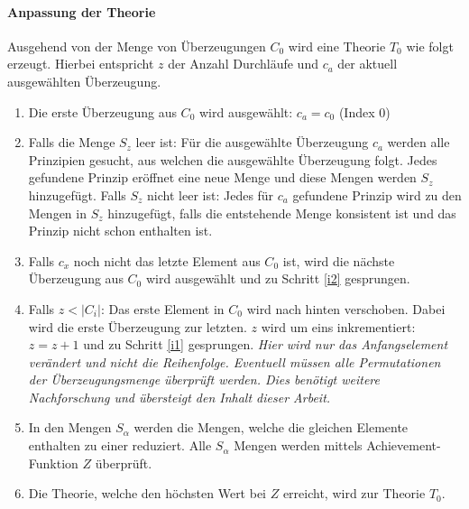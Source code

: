 \documentclass{article}
\begin{document}
\paragraph{Anpassung der Theorie}
Ausgehend von der Menge von Überzeugungen $C_0$ wird eine Theorie $T_0$ wie folgt erzeugt. Hierbei entspricht $z$ der Anzahl Durchläufe und $c_a$ der aktuell ausgewählten Überzeugung. 
\begin{enumerate}
    \item \label{i1} Die erste Überzeugung aus $C_0$ wird ausgewählt: $c_a = c_0$ (Index 0)
    \item \label{i2} Falls die Menge $S_z$ leer ist: Für die ausgewählte Überzeugung $c_a$ werden alle Prinzipien gesucht, aus welchen die ausgewählte Überzeugung folgt. Jedes gefundene Prinzip eröffnet eine neue Menge und diese Mengen werden $S_z$ hinzugefügt. Falls $S_z$ nicht leer ist: Jedes für $c_a$ gefundene Prinzip wird zu den Mengen in $S_z$ hinzugefügt, falls die entstehende Menge konsistent ist und das Prinzip nicht schon enthalten ist.
    \item \label{i3} Falls $c_x$ noch nicht das letzte Element aus $C_0$ ist, wird die nächste Überzeugung aus $C_0$ wird ausgewählt und zu Schritt \ref{i2} gesprungen.
    \item \label{i4} Falls $z < \lvert C_i \rvert$: Das erste Element in $C_0$ wird nach hinten verschoben. Dabei wird die erste Überzeugung zur letzten. $z$ wird um eins inkrementiert: $z = z + 1$ und zu Schritt \ref{i1} gesprungen. \textit{ Hier wird nur das Anfangselement verändert und nicht die Reihenfolge. Eventuell müssen alle Permutationen der Überzeugungsmenge überprüft werden. Dies benötigt weitere Nachforschung und übersteigt den Inhalt dieser Arbeit.}
    \item \label{i5} In den Mengen $S_\alpha$ werden die Mengen, welche die gleichen Elemente enthalten zu einer reduziert. Alle $S_\alpha$ Mengen werden mittels Achievement-Funktion $Z$ überprüft.
    \item \label{i6} Die Theorie, welche den höchsten Wert bei $Z$ erreicht, wird zur Theorie $T_0$.
\end{enumerate}
\end{document}
